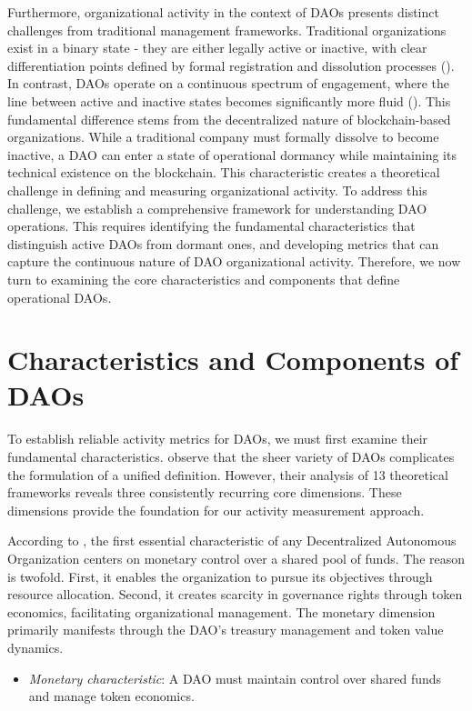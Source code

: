 Furthermore, organizational activity in the context of DAOs presents distinct challenges from traditional management frameworks. Traditional organizations exist in a binary state - they are either legally active or inactive, with clear differentiation points defined by formal registration and dissolution processes (\cite{CompaniesAct2006}). In contrast, DAOs operate on a continuous spectrum of engagement, where the line between active and inactive states becomes significantly more fluid (\cite{tan2023open}).
%
This fundamental difference stems from the decentralized nature of blockchain-based organizations. While a traditional company must formally dissolve to become inactive, a DAO can enter a state of operational dormancy while maintaining its technical existence on the blockchain. This characteristic creates a theoretical challenge in defining and measuring organizational activity.
%
To address this challenge, we establish a comprehensive framework for understanding DAO operations. This requires identifying the fundamental characteristics that distinguish active DAOs from dormant ones, and developing metrics that can capture the continuous nature of DAO organizational activity. Therefore, we now turn to examining the core characteristics and components that define operational DAOs.


\section{Characteristics and Components of DAOs}
To establish reliable activity metrics for DAOs, we must first examine their fundamental characteristics. \textcite{rikken2023ins} observe that the sheer variety of DAOs complicates the formulation of a unified definition. However, their analysis of 13 theoretical frameworks reveals three consistently recurring core dimensions. These dimensions provide the foundation for our activity measurement approach.

According to \textcite{buterin2013ethereum}, the first essential characteristic of any Decentralized Autonomous Organization centers on monetary control over a shared pool of funds.
The reason is twofold. First, it enables the organization to pursue its objectives through resource allocation. Second, it creates scarcity in governance rights through token economics, facilitating organizational management.
The monetary dimension primarily manifests through the DAO's treasury management and token value dynamics.
\begin{itemize}
    \item \textit{Monetary characteristic}: A DAO must maintain control over shared funds and manage token economics.
\end{itemize}

